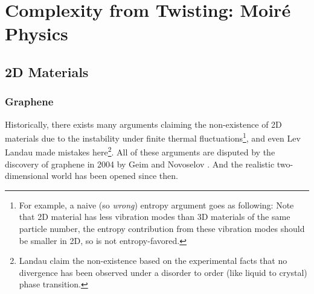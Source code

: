 

\section{Complexity from Twisting: Moir\'{e} Physics}
\subsection{2D Materials}
\subsubsection{Graphene}
Historically, there exists many arguments claiming the non-existence of 2D materials due to the instability under finite thermal fluctuations\footnote{For example, a naive (so \emph{wrong}) entropy argument goes as following: Note that 2D material has less vibration modes than 3D materials of the same particle number, the entropy contribution from these vibration modes should be smaller in 2D, so is not entropy-favored.}, and even Lev Landau made mistakes here\footnote{Landau claim the non-existence based on the experimental facts that no divergence has been observed under a disorder to order (like liquid to crystal) phase transition.}. All of these arguments are disputed by the discovery of graphene in 2004 by Geim and Novoselov \cite{novoselov2004electric}. And the realistic two-dimensional world has been opened since then.

